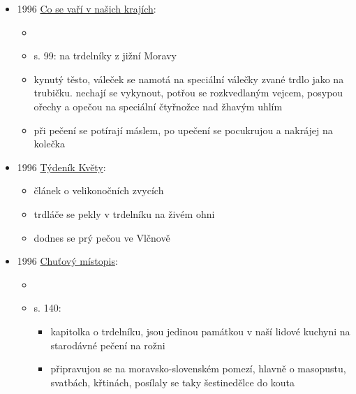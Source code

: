 \begin{itemize}
\begin{itemize}
    \begin{itemize}
    \tightlist
    \item
       rožněnej trdelník z Ořechova
       a smaženej z Oslavanska nebo
      Brněnska
    \item
      rožeň na rožněnej vypadá, že se dělal z loukotě u kola
    \end{itemize}
  \end{itemize}
\item
  1996
  \href{https://ceskadigitalniknihovna.cz/uuid/uuid:f7075980-dd45-11ee-bb18-0050568d319f}{Co
  se vaří v našich krajích}:

  \begin{itemize}
  \tightlist
  \item
  \item
    s. 99:  na trdelníky z jižní Moravy
  \item
    kynutý těsto, váleček se namotá na speciální válečky zvané trdlo
    jako na trubičku. nechají se vykynout, potřou se rozkvedlaným
    vejcem, posypou ořechy a opečou na speciální čtyřnožce nad žhavým
    uhlím
  \item
    při pečení se potírají máslem, po upečení se pocukrujou a nakrájej
    na kolečka
  \end{itemize}
\item
  1996
  \href{https://ceskadigitalniknihovna.cz/uuid/uuid:df7cfd60-8b4d-11e3-aa9f-5ef3fc9ae867}{Týdeník
  Květy}:

  \begin{itemize}
  \tightlist
  \item
    článek o velikonočních zvycích
  \item
    trdláče se pekly v trdelníku na živém ohni
  \item
    dodnes se prý pečou ve Vlčnově
  \end{itemize}
\item
  1996
  \href{https://ndk.cz/uuid/uuid:955967f0-58cb-11e8-983f-005056827e51}{Chuťový
  místopis}:

  \begin{itemize}
  \tightlist
  \item
  \item
    s. 140:

    \begin{itemize}
    \tightlist
    \item
      kapitolka o trdelníku, jsou jedinou památkou v naší lidové kuchyni
      na starodávné pečení na rožni
    \item
      připravujou se na moravsko-slovenském pomezí, hlavně o masopustu,
      svatbách, křtinách, posílaly se taky šestinedělce do kouta


\end{itemize}
\end{itemize}
\end{itemize}
